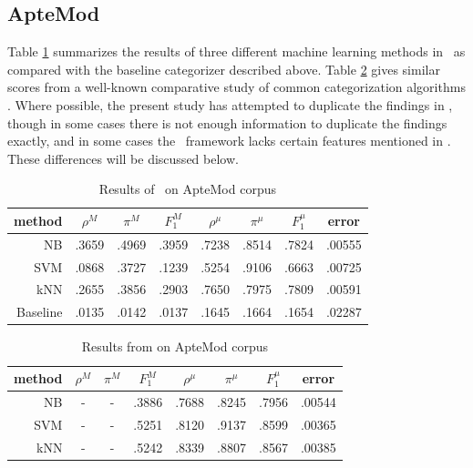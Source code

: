 \subsection{ApteMod}

Table \ref{aptemod-results} summarizes the results of three different
machine learning methods in \aicat\ as compared with the baseline
categorizer described above.  Table \ref{aptemod-yang} gives similar
scores from a well-known comparative study of common categorization
algorithms \cite{yang:99}. Where possible, the present study has
attempted to duplicate the findings in \cite{yang:99}, though in some
cases there is not enough information to duplicate the findings
exactly, and in some cases the \aicat\ framework lacks certain
features mentioned in \cite{yang:99}.  These differences will be
discussed below.

\begin{table}
\begin{center}
\begin{tabular}{|r c c c c c c c|}
\hline
method    & $\rho^M$ & $\pi^M$ & $F_1^M$ & $\rho^\mu$ & $\pi^\mu$ & $F_1^\mu$ &   error \\
\hline
NB        &   .3659  &  .4969  &  .3959  &  .7238     &  .8514    &  .7824    &  .00555 \\
SVM       &   .0868  &  .3727  &  .1239  &  .5254     &  .9106    &  .6663    &  .00725 \\
kNN       &   .2655  &  .3856  &  .2903  &  .7650     &  .7975    &  .7809    &  .00591 \\
Baseline  &   .0135  &  .0142  &  .0137  &  .1645     &  .1664    &  .1654    &  .02287 \\
\hline
\end{tabular}
\end{center}
\caption{Results of \aicat\ on ApteMod corpus}
\label{aptemod-results}
\end{table}

\begin{table}
\begin{center}
\begin{tabular}{|r c c c c c c c|}
\hline
method & $\rho^M$ & $\pi^M$ & $F_1^M$ & $\rho^\mu$ & $\pi^\mu$ & $F_1^\mu$ & error \\
\hline
NB  & - & - & .3886 & .7688 & .8245 & .7956 & .00544 \\
SVM & - & - & .5251 & .8120 & .9137 & .8599 & .00365 \\
kNN & - & - & .5242 & .8339 & .8807 & .8567 & .00385 \\
\hline
\end{tabular}
\end{center}
\caption{Results from \cite{yang:99} on ApteMod corpus}
\label{aptemod-yang}
\end{table}

